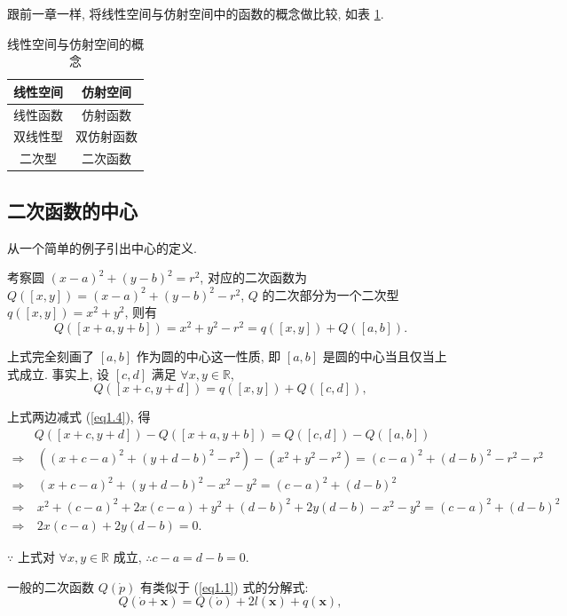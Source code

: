 \documentclass[color=black,device=normal,lang=cn,mode=geye]{elegantnote}
\begin{document}
跟前一章一样, 将线性空间与仿射空间中的函数的概念做比较, 如表 \ref{tb1}.
\begin{table}\caption{线性空间与仿射空间的概念}\label{tb1}
    \begin{center}
        \begin{tabular}{c|c}
            线性空间 & 仿射空间 \\
            \hline
            线性函数 & 仿射函数 \\
            双线性型 & 双仿射函数 \\
            二次型 & 二次函数 \\
        \end{tabular}
    \end{center}
\end{table}
\subsection{二次函数的中心}
从一个简单的例子引出中心的定义.
\begin{example}
    考察圆 $(x-a)^2+(y-b)^2=r^2$, 对应的二次函数为 $Q([x,y])=(x-a)^2+(y-b)^2-r^2$, $Q$ 的二次部分为一个二次型 $q([x,y])=x^2+y^2$, 则有
    \begin{equation}\label{eq1.4}
        Q([x+a,y+b])=x^2+y^2-r^2=q([x,y])+Q([a,b]).
    \end{equation}
    
    上式完全刻画了 $[a,b]$ 作为圆的中心这一性质, 即 $[a,b]$ 是圆的中心当且仅当上式成立. 事实上, 设 $[c,d]$ 满足 $\forall x,y\in\mathbb{R}$,
    \[Q([x+c,y+d])=q([x,y])+Q([c,d]),\]

    上式两边减式 (\ref{eq1.4}), 得
    \begin{align*}
        & Q([x+c,y+d])-Q([x+a,y+b])=Q([c,d])-Q([a,b]) \\
        \Rightarrow &\ ((x+c-a)^2+(y+d-b)^2-r^2)-(x^2+y^2-r^2)=(c-a)^2+(d-b)^2-r^2-r^2 \\
        \Rightarrow &\ (x+c-a)^2+(y+d-b)^2-x^2-y^2=(c-a)^2+(d-b)^2 \\
        \Rightarrow &\ x^2+(c-a)^2+2x(c-a)+y^2+(d-b)^2+2y(d-b)-x^2-y^2=(c-a)^2+(d-b)^2 \\
        \Rightarrow &\ 2x(c-a)+2y(d-b)=0.
    \end{align*}

    $\because$ 上式对 $\forall x,y\in\mathbb{R}$ 成立, $\therefore c-a=d-b=0$.
\end{example}
一般的二次函数 $Q(\dot{p})$ 有类似于 (\ref{eq1.1}) 式的分解式:
\[Q(\dot{o}+\boldsymbol{x})=Q(\dot{o})+2l(\boldsymbol{x})+q(\boldsymbol{x}),\]
\end{document}
